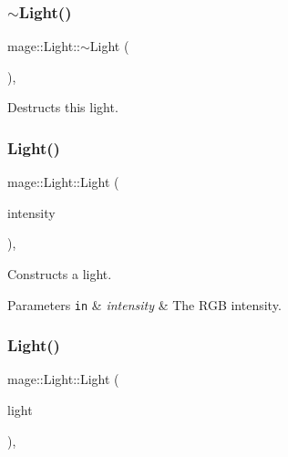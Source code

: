 \subsubsection{\texorpdfstring{$\sim$\+Light()}{~Light()}}
{\footnotesize\ttfamily mage\+::\+Light\+::$\sim$\+Light (\begin{DoxyParamCaption}{ }\end{DoxyParamCaption})\hspace{0.3cm}{\ttfamily [virtual]}, {\ttfamily [default]}}

Destructs this light. \hypertarget{classmage_1_1_light_ab470ad4bde2c1e27068541bb53accb0c}{}\label{classmage_1_1_light_ab470ad4bde2c1e27068541bb53accb0c} 
\subsubsection{\texorpdfstring{Light()}{Light()}\hspace{0.1cm}{\footnotesize\ttfamily [1/3]}}
{\footnotesize\ttfamily mage\+::\+Light\+::\+Light (\begin{DoxyParamCaption}\item[{const \hyperlink{structmage_1_1_r_g_b_spectrum}{R\+G\+B\+Spectrum} \&}]{intensity }\end{DoxyParamCaption})\hspace{0.3cm}{\ttfamily [explicit]}, {\ttfamily [protected]}}

Constructs a light.


\begin{DoxyParams}[1]{Parameters}
\mbox{\tt in}  & {\em intensity} & The R\+GB intensity. \\
\hline
\end{DoxyParams}
\hypertarget{classmage_1_1_light_aa91ba3fde50487939d99252c73f732cc}{}\label{classmage_1_1_light_aa91ba3fde50487939d99252c73f732cc} 
\subsubsection{\texorpdfstring{Light()}{Light()}\hspace{0.1cm}{\footnotesize\ttfamily [2/3]}}
{\footnotesize\ttfamily mage\+::\+Light\+::\+Light (\begin{DoxyParamCaption}\item[{const \hyperlink{classmage_1_1_light}{Light} \&}]{light }\end{DoxyParamCaption})\hspace{0.3cm}{\ttfamily [protected]}, {\ttfamily [default]}}

